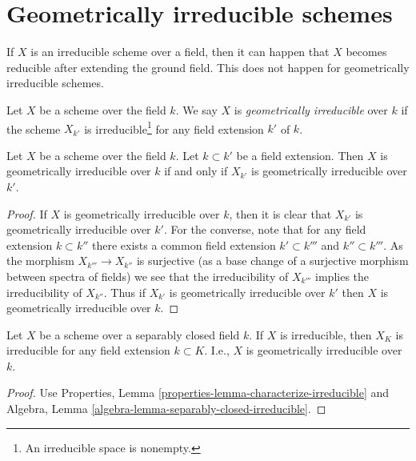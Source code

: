 \section{Geometrically irreducible schemes}
\label{section-geometrically-irreducible}

\noindent
If $X$ is an irreducible scheme over a field, then it can happen that $X$
becomes reducible after extending the ground field. This does not happen
for geometrically irreducible schemes.

\begin{definition}
\label{definition-geometrically-irreducible}
Let $X$ be a scheme over the field $k$.
We say $X$ is {\it geometrically irreducible} over $k$ if the scheme
$X_{k'}$ is irreducible\footnote{An irreducible space is nonempty.}
for any field extension $k'$ of $k$.
\end{definition}

\begin{lemma}
\label{lemma-geometrically-irreducible-check-after-extension}
Let $X$ be a scheme over the field $k$.
Let $k \subset k'$ be a field extension.
Then $X$ is geometrically irreducible over $k$ if and only if
$X_{k'}$ is geometrically irreducible over $k'$.
\end{lemma}

\begin{proof}
If $X$ is geometrically irreducible over $k$, then it is clear that
$X_{k'}$ is geometrically irreducible over $k'$. For the converse, note
that for any field extension $k \subset k''$ there exists a common
field extension $k' \subset k'''$ and $k'' \subset k'''$. As the
morphism $X_{k'''} \to X_{k''}$ is surjective (as a base change of
a surjective morphism between spectra of fields) we see that the
irreducibility of $X_{k'''}$ implies the irreducibility of $X_{k''}$.
Thus if $X_{k'}$ is geometrically irreducible over $k'$ then
$X$ is geometrically irreducible over $k$.
\end{proof}

\begin{lemma}
\label{lemma-separably-closed-irreducible}
Let $X$ be a scheme over a separably closed field $k$.
If $X$ is irreducible, then $X_K$ is irreducible for any
field extension $k \subset K$. I.e., $X$ is geometrically
irreducible over $k$.
\end{lemma}

\begin{proof}
Use Properties, Lemma \ref{properties-lemma-characterize-irreducible}
and Algebra, Lemma \ref{algebra-lemma-separably-closed-irreducible}.
\end{proof}


